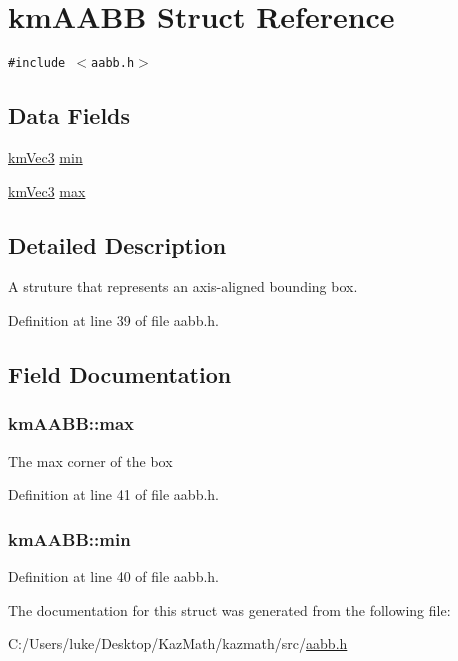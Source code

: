 \hypertarget{structkm_a_a_b_b}{
\section{kmAABB Struct Reference}
\label{structkm_a_a_b_b}
}
{\tt \#include $<$aabb.h$>$}

\subsection*{Data Fields}
\begin{CompactItemize}
\item 
\hyperlink{structkm_vec3}{kmVec3} \hyperlink{structkm_a_a_b_b_511f76c686209fd071eb8aed2d52b0ac}{min}
\item 
\hyperlink{structkm_vec3}{kmVec3} \hyperlink{structkm_a_a_b_b_b408e258b39d873882e2b3b335cf88d7}{max}
\end{CompactItemize}


\subsection{Detailed Description}
A struture that represents an axis-aligned bounding box. 

Definition at line 39 of file aabb.h.

\subsection{Field Documentation}
\hypertarget{structkm_a_a_b_b_b408e258b39d873882e2b3b335cf88d7}{
\subsubsection[{max}]{ {\bf kmAABB::max}}}
\label{structkm_a_a_b_b_b408e258b39d873882e2b3b335cf88d7}


The max corner of the box 

Definition at line 41 of file aabb.h.\hypertarget{structkm_a_a_b_b_511f76c686209fd071eb8aed2d52b0ac}{
\subsubsection[{min}]{ {\bf kmAABB::min}}}
\label{structkm_a_a_b_b_511f76c686209fd071eb8aed2d52b0ac}




Definition at line 40 of file aabb.h.

The documentation for this struct was generated from the following file:\begin{CompactItemize}
\item 
C:/Users/luke/Desktop/KazMath/kazmath/src/\hyperlink{aabb_8h}{aabb.h}\end{CompactItemize}

